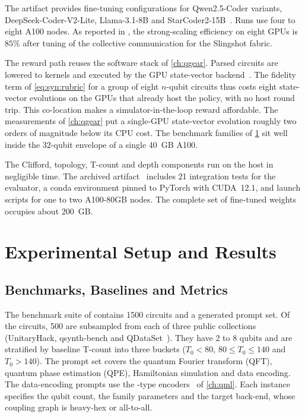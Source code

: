 The artifact provides fine-tuning configurations for Qwen2.5-Coder variants, DeepSeek-Coder-V2-Lite, Llama-3.1-8B and StarCoder2-15B~\cite{guo2026rubriqsoftware}. Runs use four to eight A100 nodes. As reported in \cite{guo2026rubriq}, the strong-scaling efficiency on eight GPUs is $85\%$ after tuning of the collective communication for the Slingshot fabric.

The reward path reuses the software stack of \cref{ch:qgear}. Parsed circuits are lowered to \cudaq{} kernels and executed by the GPU state-vector backend~\cite{kim2023cudaquantum}. The fidelity term of \cref{eq:syn:rubric} for a group of eight $n$-qubit circuits thus costs eight state-vector evolutions on the GPUs that already host the policy, with no host round trip. This co-location makes a simulator-in-the-loop reward affordable. The \qgear{} measurements of \cref{ch:qgear} put a single-GPU state-vector evolution roughly two orders of magnitude below its CPU cost. The benchmark families of \cref{sec:syn:results} sit well inside the $32$-qubit envelope of a single 40~GB A100.

The Clifford, topology, T-count and depth components run on the host in negligible time. The archived artifact~\cite{guo2026rubriqsoftware} includes 21 integration tests for the evaluator, a conda environment pinned to PyTorch with CUDA~12.1, and launch scripts for one to two A100-80GB nodes. The complete set of fine-tuned weights occupies about 200~GB.

\section{Experimental Setup and Results}\label{sec:syn:results}

\subsection{Benchmarks, Baselines and Metrics}\label{sec:syn:setup}

The benchmark suite of \cite{guo2026rubriq} contains \num{1500} circuits and a generated prompt set. Of the circuits, 500 are subsampled from each of three public collections (UnitaryHack, qsynth-bench and QDataSet~\cite{perrier2022qdataset}). They have 2 to 8 qubits and are stratified by baseline T-count into three buckets ($T_0<80$, $80\le T_0\le 140$ and $T_0>140$). The prompt set covers the quantum Fourier transform (QFT), quantum phase estimation (QPE), Hamiltonian simulation and data encoding. The data-encoding prompts use the \qcrank{}-type encoders~\cite{balewski2024qcrank} of \cref{ch:qml}. Each instance specifies the qubit count, the family parameters and the target back-end, whose coupling graph is heavy-hex or all-to-all.

